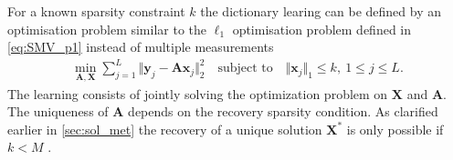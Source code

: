 For a known sparsity constraint $k$ the dictionary learing can be defined by an optimisation problem similar to the $\ell_1$ optimisation problem defined in \eqref{eq:SMV_p1} instead of multiple measurements \cite{Elad_book}
\begin{align}\label{eq:SVD1}
\min_{\mathbf{A}, \mathbf{X}} \sum_{j=1}^{L} \Vert \mathbf{y}_j - \mathbf{A} \mathbf{x}_j \Vert_2^2 \quad \text{subject to} \quad \Vert \textbf{x}_j \Vert_1 \leq k, \ 1 \leq j \leq L.
\end{align}  
The learning consists of jointly solving the optimization problem on $\mathbf{X}$ and $\mathbf{A}$. The uniqueness of $\mathbf{A}$ depends on the recovery sparsity condition. As clarified earlier in \ref{sec:sol_met} the recovery of a unique solution $\mathbf{X}^\ast$ is only possible if $k < M$ \cite{phd2015}.

